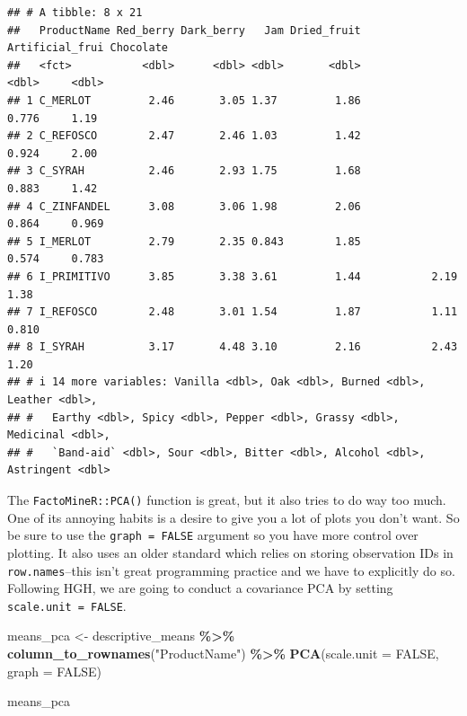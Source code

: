 \documentclass[
]{book}
\newenvironment{Shaded}{\begin{snugshade}}{\end{snugshade}}
\newcommand{\AttributeTok}[1]{\textcolor[rgb]{0.13,0.29,0.53}{#1}}
\newcommand{\ConstantTok}[1]{\textcolor[rgb]{0.56,0.35,0.01}{#1}}
\newcommand{\FunctionTok}[1]{\textcolor[rgb]{0.13,0.29,0.53}{\textbf{#1}}}
\newcommand{\NormalTok}[1]{#1}
\newcommand{\OtherTok}[1]{\textcolor[rgb]{0.56,0.35,0.01}{#1}}
\newcommand{\SpecialCharTok}[1]{\textcolor[rgb]{0.81,0.36,0.00}{\textbf{#1}}}
\newcommand{\StringTok}[1]{\textcolor[rgb]{0.31,0.60,0.02}{#1}}
\begin{document}
\begin{verbatim}
## # A tibble: 8 x 21
##   ProductName Red_berry Dark_berry   Jam Dried_fruit Artificial_frui Chocolate
##   <fct>           <dbl>      <dbl> <dbl>       <dbl>           <dbl>     <dbl>
## 1 C_MERLOT         2.46       3.05 1.37         1.86           0.776     1.19 
## 2 C_REFOSCO        2.47       2.46 1.03         1.42           0.924     2.00 
## 3 C_SYRAH          2.46       2.93 1.75         1.68           0.883     1.42 
## 4 C_ZINFANDEL      3.08       3.06 1.98         2.06           0.864     0.969
## 5 I_MERLOT         2.79       2.35 0.843        1.85           0.574     0.783
## 6 I_PRIMITIVO      3.85       3.38 3.61         1.44           2.19      1.38 
## 7 I_REFOSCO        2.48       3.01 1.54         1.87           1.11      0.810
## 8 I_SYRAH          3.17       4.48 3.10         2.16           2.43      1.20 
## # i 14 more variables: Vanilla <dbl>, Oak <dbl>, Burned <dbl>, Leather <dbl>,
## #   Earthy <dbl>, Spicy <dbl>, Pepper <dbl>, Grassy <dbl>, Medicinal <dbl>,
## #   `Band-aid` <dbl>, Sour <dbl>, Bitter <dbl>, Alcohol <dbl>, Astringent <dbl>
\end{verbatim}

The \texttt{FactoMineR::PCA()} function is great, but it also tries to do way too much. One of its annoying habits is a desire to give you a lot of plots you don't want. So be sure to use the \texttt{graph\ =\ FALSE} argument so you have more control over plotting. It also uses an older standard which relies on storing observation IDs in \texttt{row.names}--this isn't great programming practice and we have to explicitly do so. Following HGH, we are going to conduct a covariance PCA by setting \texttt{scale.unit\ =\ FALSE}.

\begin{Shaded}
\begin{Highlighting}[]
\NormalTok{means\_pca }\OtherTok{\textless{}{-}} 
\NormalTok{  descriptive\_means }\SpecialCharTok{\%\textgreater{}\%}
  \FunctionTok{column\_to\_rownames}\NormalTok{(}\StringTok{"ProductName"}\NormalTok{) }\SpecialCharTok{\%\textgreater{}\%}
  \FunctionTok{PCA}\NormalTok{(}\AttributeTok{scale.unit =} \ConstantTok{FALSE}\NormalTok{, }\AttributeTok{graph =} \ConstantTok{FALSE}\NormalTok{)}

\NormalTok{means\_pca}
\end{Highlighting}
\end{Shaded}
\end{document}
